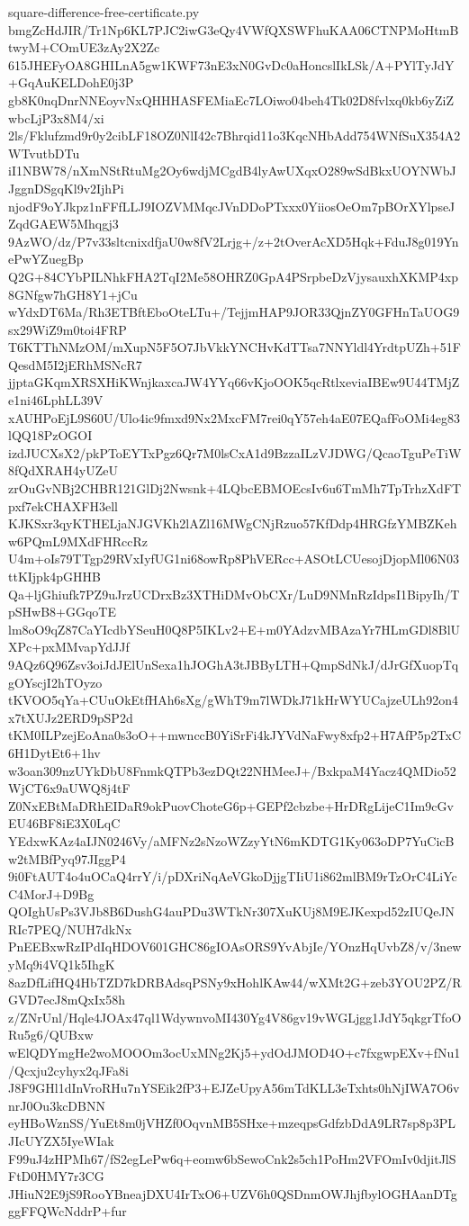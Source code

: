 \documentclass[11pt]{article}
\theoremstyle{definition}
\theoremstyle{remark}
\begin{document}
\begin{filecontents*}[overwrite]{square-difference-free-certificate.py}
bmgZcHdJIR/Tr1Np6KL7PJC2iwG3eQy4VWfQXSWFhuKAA06CTNPMoHtmBtwyM+COmUE3zAy2X2Zc
615JHEFyOA8GHILnA5gw1KWF73nE3xN0GvDc0aHoncslIkLSk/A+PYlTyJdY+GqAuKELDohE0j3P
gb8K0nqDnrNNEoyvNxQHHHASFEMiaEc7LOiwo04beh4Tk02D8fvlxq0kb6yZiZwbcLjP3x8M4/xi
2ls/Fklufzmd9r0y2cibLF18OZ0NlI42c7Bhrqid11o3KqcNHbAdd754WNfSuX354A2WTvutbDTu
iI1NBW78/nXmNStRtuMg2Oy6wdjMCgdB4lyAwUXqxO289wSdBkxUOYNWbJJggnDSgqKl9v2IjhPi
njodF9oYJkpz1nFFfLLJ9IOZVMMqcJVnDDoPTxxx0YiiosOeOm7pBOrXYlpseJZqdGAEW5Mhqgj3
9AzWO/dz/P7v33sltcnixdfjaU0w8fV2Lrjg+/z+2tOverAcXD5Hqk+FduJ8g019YnePwYZuegBp
Q2G+84CYbPILNhkFHA2TqI2Me58OHRZ0GpA4PSrpbeDzVjysauxhXKMP4xp8GNfgw7hGH8Y1+jCu
wYdxDT6Ma/Rh3ETBftEboOteLTu+/TejjmHAP9JOR33QjnZY0GFHnTaUOG9sx29WiZ9m0toi4FRP
T6KTThNMzOM/mXupN5F5O7JbVkkYNCHvKdTTsa7NNYldl4YrdtpUZh+51FQesdM5I2jERhMSNcR7
jjptaGKqmXRSXHiKWnjkaxcaJW4YYq66vKjoOOK5qcRtlxeviaIBEw9U44TMjZe1ni46LphLL39V
xAUHPoEjL9S60U/Ulo4ic9fmxd9Nx2MxcFM7rei0qY57eh4aE07EQafFoOMi4eg83lQQ18PzOGOI
izdJUCXsX2/pkPToEYTxPgz6Qr7M0lsCxA1d9BzzaILzVJDWG/QcaoTguPeTiW8fQdXRAH4yUZeU
zrOuGvNBj2CHBR121GlDj2Nwsnk+4LQbcEBMOEcsIv6u6TmMh7TpTrhzXdFTpxf7ekCHAXFH3ell
KJKSxr3qyKTHELjaNJGVKh2lAZl16MWgCNjRzuo57KfDdp4HRGfzYMBZKehw6PQmL9MXdFHRccRz
U4m+oIs79TTgp29RVxIyfUG1ni68owRp8PhVERcc+ASOtLCUesojDjopMl06N03ttKIjpk4pGHHB
Qa+ljGhiufk7PZ9uJrzUCDrxBz3XTHiDMvObCXr/LuD9NMnRzIdpsI1BipyIh/TpSHwB8+GGqoTE
lm8oO9qZ87CaYIcdbYSeuH0Q8P5IKLv2+E+m0YAdzvMBAzaYr7HLmGDl8BlUXPc+pxMMvapYdJJf
9AQz6Q96Zsv3oiJdJElUnSexa1hJOGhA3tJBByLTH+QmpSdNkJ/dJrGfXuopTqgOYscjI2hTOyzo
tKVOO5qYa+CUuOkEtfHAh6sXg/gWhT9m7lWDkJ71kHrWYUCajzeULh92on4x7tXUJz2ERD9pSP2d
tKM0ILPzejEoAna0s3oO++mwnccB0YiSrFi4kJYVdNaFwy8xfp2+H7AfP5p2TxC6H1DytEt6+1hv
w3oan309nzUYkDbU8FnmkQTPb3ezDQt22NHMeeJ+/BxkpaM4Yacz4QMDio52WjCT6x9aUWQ8j4tF
Z0NxEBtMaDRhEIDaR9okPuovChoteG6p+GEPf2cbzbe+HrDRgLijeC1Im9cGvEU46BF8iE3X0LqC
YEdxwKAz4aIJN0246Vy/aMFNz2sNzoWZzyYtN6mKDTG1Ky063oDP7YuCicBw2tMBfPyq97JIggP4
9i0FtAUT4o4uOCaQ4rrY/i/pDXriNqAeVGkoDjjgTIiU1i862mlBM9rTzOrC4LiYcC4MorJ+D9Bg
QOIghUsPs3VJb8B6DushG4auPDu3WTkNr307XuKUj8M9EJKexpd52zIUQeJNRIc7PEQ/NUH7dkNx
PnEEBxwRzIPdIqHDOV601GHC86gIOAsORS9YvAbjIe/YOnzHqUvbZ8/v/3newyMq9i4VQ1k5IhgK
8azDfLifHQ4HbTZD7kDRBAdsqPSNy9xHohlKAw44/wXMt2G+zeb3YOU2PZ/RGVD7ecJ8mQxIx58h
z/ZNrUnl/Hqle4JOAx47ql1WdywnvoMI430Yg4V86gv19vWGLjgg1JdY5qkgrTfoORu5g6/QUBxw
wElQDYmgHe2woMOOOm3ocUxMNg2Kj5+ydOdJMOD4O+c7fxgwpEXv+fNu1/Qcxju2cyhyx2qJFa8i
J8F9GHl1dInVroRHu7nYSEik2fP3+EJZeUpyA56mTdKLL3eTxhts0hNjIWA7O6vnrJ0Ou3kcDBNN
eyHBoWznSS/YuEt8m0jVHZf0OqvnMB5SHxe+mzeqpsGdfzbDdA9LR7sp8p3PLJIcUYZX5IyeWIak
F99uJ4zHPMh67/fS2egLePw6q+eomw6bSewoCnk2s5ch1PoHm2VFOmIv0djitJlSFtD0HMY7r3CG
JHiuN2E9jS9RooYBneajDXU4IrTxO6+UZV6h0QSDnmOWJhjfbylOGHAanDTgggFFQWcNddrP+fur

\end{filecontents*}
\end{document}
